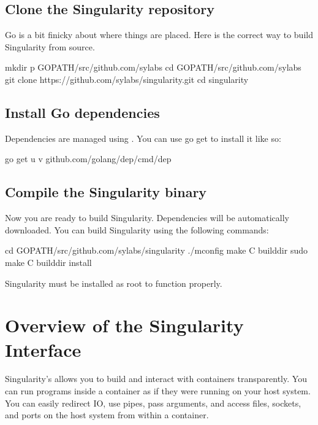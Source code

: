 \documentclass[letterpaper,10pt,english]{sphinxmanual}
\begin{document}
\subsection{Clone the Singularity repository}
\label{\detokenize{quick_start:clone-the-singularity-repository}}
Go is a bit finicky about where things are placed. Here is the correct way to
build Singularity from source.

%
\begin{sphinxVerbatim}[commandchars=\\\{\}]
\PYGZdl{} mkdir \PYGZhy{}p \PYGZdl{}GOPATH/src/github.com/sylabs
\PYGZdl{} cd \PYGZdl{}GOPATH/src/github.com/sylabs
\PYGZdl{} git clone https://github.com/sylabs/singularity.git
\PYGZdl{} cd singularity
\end{sphinxVerbatim}


\subsection{Install Go dependencies}
\label{\detokenize{quick_start:install-go-dependencies}}
Dependencies are managed using . You
can use go get to install it like so:

%
\begin{sphinxVerbatim}[commandchars=\\\{\}]
\PYGZdl{} go get \PYGZhy{}u \PYGZhy{}v github.com/golang/dep/cmd/dep
\end{sphinxVerbatim}


\subsection{Compile the Singularity binary}
\label{\detokenize{quick_start:compile-the-singularity-binary}}
Now you are ready to build Singularity. Dependencies will be automatically
downloaded. You can build Singularity using the following commands:

%
\begin{sphinxVerbatim}[commandchars=\\\{\}]
\PYGZdl{} cd \PYGZdl{}GOPATH/src/github.com/sylabs/singularity
\PYGZdl{} ./mconfig
\PYGZdl{} make \PYGZhy{}C builddir
\PYGZdl{} sudo make \PYGZhy{}C builddir install
\end{sphinxVerbatim}

Singularity must be installed as root to function properly.


\section{Overview of the Singularity Interface}
\label{\detokenize{quick_start:overview-of-the-singularity-interface}}
Singularity’s  allows you to build
and interact with containers transparently. You can run programs inside a
container as if they were running on your host system. You can easily redirect
IO, use pipes, pass arguments, and access files, sockets, and ports on the host
system from within a container.
\end{document}
